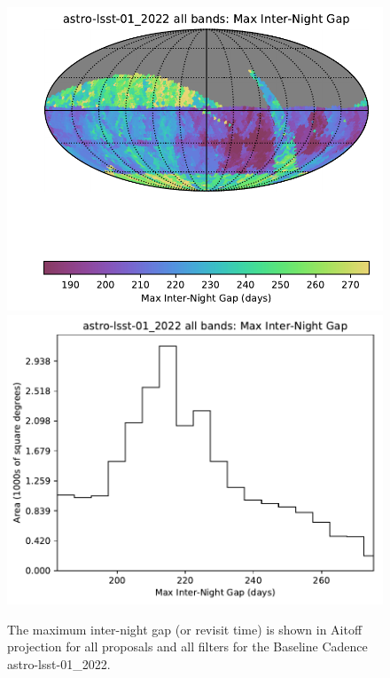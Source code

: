 \documentclass[DM,lsstdraft,authoryear,toc]{lsstdoc}
\begin{document}
\begin{figure}[t!]
\vskip -0.0in
\includegraphics[angle=0,width=0.49\hsize,clip]{figures/astro-lsst-01_2022_Max_Inter-Night_Gap_all_bands_HEAL_SkyMap.pdf}
\includegraphics[angle=0,width=0.49\hsize,clip]{figures/astro-lsst-01_2022_Max_Inter-Night_Gap_all_bands_HEAL_Histogram.pdf}
\vskip -0.1in
\caption{The maximum inter-night gap (or revisit time) is shown in Aitoff projection
for all proposals and all filters for the Baseline Cadence astro-lsst-01\_2022.}
\label{fig:baseline_MAXGapAll}
\end{figure}
\end{document}
